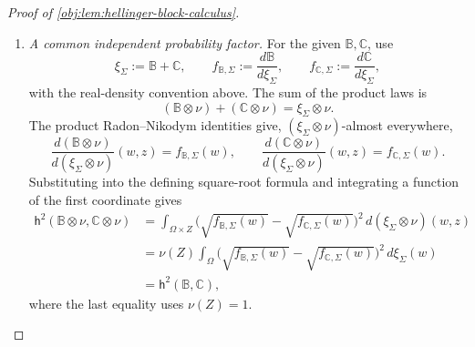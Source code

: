 \begin{proof}[Proof of \cref{obj:lem:hellinger-block-calculus}]
\begin{enumerate}
\item \emph{A common independent probability factor.}
For the given \(\mathbb B,\mathbb C\), use
\[
\xi_{\Sigma}:=\mathbb B+\mathbb C,
\qquad
f_{\mathbb B,\Sigma}:=\frac{d\mathbb B}{d\xi_{\Sigma}},
\qquad
f_{\mathbb C,\Sigma}:=\frac{d\mathbb C}{d\xi_{\Sigma}},
\]
with the real-density convention above. The sum of the product laws is
\[
(\mathbb B\otimes\nu)+(\mathbb C\otimes\nu)
=\xi_{\Sigma}\otimes\nu.
\]
The product Radon--Nikodym identities give, \((\xi_{\Sigma}\otimes\nu)\)-almost everywhere,
\[
\frac{d(\mathbb B\otimes\nu)}{d(\xi_{\Sigma}\otimes\nu)}(w,z)
=f_{\mathbb B,\Sigma}(w),
\qquad
\frac{d(\mathbb C\otimes\nu)}{d(\xi_{\Sigma}\otimes\nu)}(w,z)
=f_{\mathbb C,\Sigma}(w).
\]
Substituting into the defining square-root formula and integrating a function of the first coordinate gives
\[
\begin{aligned}
\mathsf h^2(\mathbb B\otimes\nu,\mathbb C\otimes\nu)
&=
\int_{\Omega\times Z}
\bigl(\sqrt{f_{\mathbb B,\Sigma}(w)}
      -\sqrt{f_{\mathbb C,\Sigma}(w)}\bigr)^2
\,d(\xi_{\Sigma}\otimes\nu)(w,z)\\
&=
\nu(Z)
\int_\Omega
\bigl(\sqrt{f_{\mathbb B,\Sigma}(w)}
      -\sqrt{f_{\mathbb C,\Sigma}(w)}\bigr)^2
\,d\xi_{\Sigma}(w)\\
&=\mathsf h^2(\mathbb B,\mathbb C),
\end{aligned}
\]
where the last equality uses \(\nu(Z)=1\).
\end{enumerate}
\end{proof}
